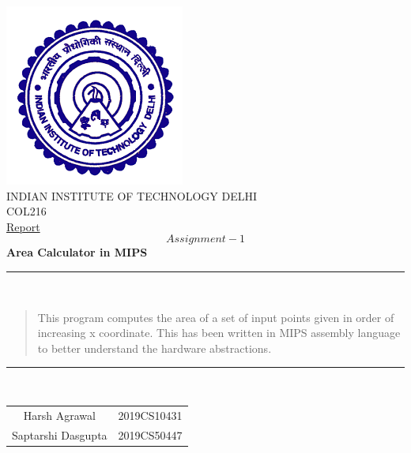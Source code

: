 \documentclass[hidelinks,12pt]{article}
\begin{document}
\begin{titlepage}
    \centering
    \includegraphics[scale=0.5]{../../logo.png}\\[1.0cm]
    \Large INDIAN INSTITUTE OF TECHNOLOGY DELHI\\[1.0 cm]
    \LARGE COL216\\[0.1cm]
    \Large \underline{Report}\\
    \large \[Assignment-1\]
    \LARGE \textbf{Area Calculator in MIPS}
    

    \rule{\textwidth}{0.2 mm} \\[0.1cm]
    \begin{abstract}
        This program computes the area of a set of input points given in order of increasing x coordinate.
        This has been written in MIPS assembly language to better understand the hardware abstractions.
                \\[0.1cm]    
    \end{abstract}
    \rule{\textwidth}{0.2 mm} \\[0.1cm]
    \begin{flushright}
        
        \begin{tabular}{c c}
            \small {Harsh Agrawal} & \small {2019CS10431} \\
            \small {Saptarshi Dasgupta} & \small {2019CS50447} \\
        \end{tabular}
    \end{flushright}
\end{titlepage}
\tableofcontents
\newpage
\end{document}
